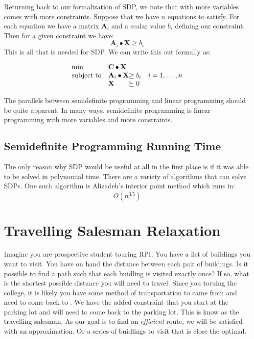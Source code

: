 \documentclass{article}
\begin{document}
Returning back to our formalization of SDP, we note that with more variables comes with more constraints. Suppose that we have \( n \) equations to satisfy. For each equation we have a matrix \( \mathbf{A}_i \) and a scalar value \( b_i \) defining our constraint. Then for a given constraint we have:
\[
\mathbf{A}_i \bullet \mathbf{X} \geq b_i
\]
This is all that is needed for SDP. We can write this out formally as:

\begin{align*}
  \begin{array}{ll@{}ll}
  \min              & \mathbf{C} \bullet \mathbf{X}                   & \\
  \text{subject to} & \mathbf{A}_i \bullet \mathbf{X} &\geq b_i       & i=1 ,\dots, n\\
                    & \mathbf{X}                      &\succeq 0
  \end{array}
\end{align*}

The parallels between semidefinite programming and linear programming should be quite apparent.
In many ways, semidefinite programming is linear programming with more variables and more constraints.

\subsection{Semidefinite Programming Running Time}
The only reason why SDP would be useful at all in the first place is if it was able to be solved in polynomial time. 
There are a variety of algorithms that can solve SDPs. 
One such algorithm is Alizadeh's interior point method which runs in:
\[ \tilde{O}(n^{3.5}) \]

\section{Travelling Salesman Relaxation}   %
Imagine you are prospective student touring RPI. You have a list of buildings you want to visit.
You have on hand the distance between each pair of buildings. 
Is it possible to find a path such that each buidling is visited exactly once? 
If so, what is the shortest possible distance you will need to travel. 
Since you toruing the college, it is likely you have some method of transportation to came from and need to come back to . 
We have the added constraint that you start at the parking lot and will need to come back to the parking lot.
This is know as the travelling salesman.
As our goal is to find an \emph{efficient} route, we will be satisfied with an approximation. 
Or a series of buidlings to visit that is close the optimal.
\end{document}
